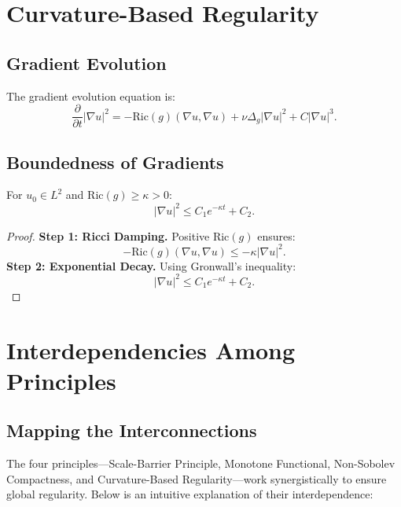 \documentclass[12pt]{article}
\theoremstyle{definition}
\theoremstyle{remark}
\begin{document}
\section{Curvature-Based Regularity}

\subsection{Gradient Evolution}
The gradient evolution equation is:
\begin{equation}
\frac{\partial}{\partial t} |\nabla u|^2 = -\text{Ric}(g)(\nabla u, \nabla u) + \nu \Delta_g |\nabla u|^2 + C|\nabla u|^3.
\end{equation}

\subsection{Boundedness of Gradients}
\begin{theorem}
For $u_0 \in L^2$ and $\text{Ric}(g) \geq \kappa > 0$:
\begin{equation}
|\nabla u|^2 \leq C_1 e^{-\kappa t} + C_2.
\end{equation}
\end{theorem}

\begin{proof}
\textbf{Step 1: Ricci Damping.} Positive $\text{Ric}(g)$ ensures:
\begin{equation}
-\text{Ric}(g)(\nabla u, \nabla u) \leq -\kappa |\nabla u|^2.
\end{equation}
\textbf{Step 2: Exponential Decay.} Using Gronwall's inequality:
\begin{equation}
|\nabla u|^2 \leq C_1 e^{-\kappa t} + C_2.
\end{equation}
\end{proof}

\section{Interdependencies Among Principles}

\subsection{Mapping the Interconnections}
The four principles---Scale-Barrier Principle, Monotone Functional, Non-Sobolev Compactness, and Curvature-Based Regularity---work synergistically to ensure global regularity. Below is an intuitive explanation of their interdependence:
\end{document}

